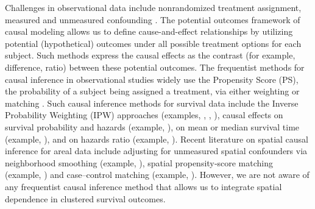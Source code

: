 \documentclass[aoas]{imsart}
\theoremstyle{plain}
\theoremstyle{definition}
\begin{document}
Challenges in observational data include nonrandomized treatment assignment, measured and unmeasured confounding \parencite{rosenbaum2002observational}. 
The potential outcomes framework \parencite{ rubin1974estimating} of causal modeling allows us to define cause-and-effect relationships by utilizing potential (hypothetical) outcomes under all possible treatment options for each subject. Such methods express the causal effects as the contrast (for example, difference, ratio) between these potential outcomes. 
The frequentist methods for causal inference in observational studies widely use the Propensity Score (PS), the probability of a subject being assigned a treatment, via either weighting \parencite{rosenbaum2002observational} or matching \parencite{rubin2006matching}.
Such causal inference methods for survival data include the Inverse Probability Weighting (IPW) approaches (examples, \parencite{xie2005adjusted}, \parencite{sugihara2010survival}, \parencite{cole2004adjusted}), causal effects on survival probability and hazards (example, \parencite{austin2016performance}), on mean or median survival time  (example,  \parencite{VanderWeele2011causal}), and on hazards ratio (example, \parencite{gayat2012propensity}). 
Recent literature on spatial causal inference for areal data 
include adjusting for unmeasured spatial confounders via neighborhood smoothing (example, \parencite{Schnell2020spatialconfounding}), spatial propensity‐score matching (example, \parencite{Davis2021propensityscore}) and case–control matching (example, \parencite{Jarner2002casecontrol}). However, we are not aware of any frequentist causal inference method that allows us to integrate spatial dependence in clustered survival outcomes.
\end{document}

